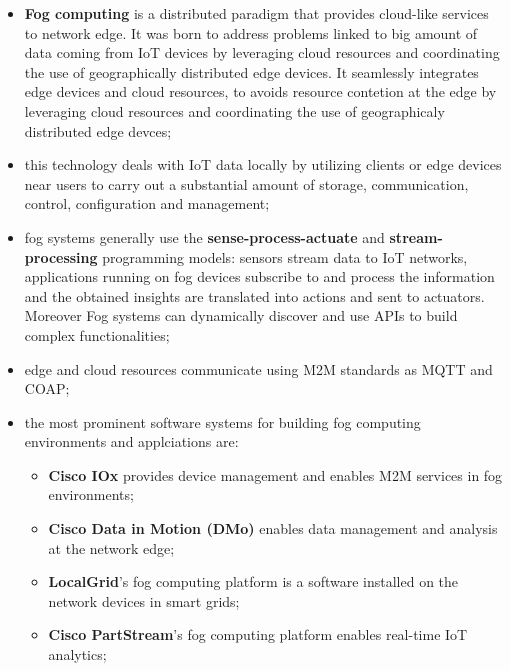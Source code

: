 \documentclass[oneside]{article}
\begin{document}
\begin{itemize}
    \item \textbf{Fog computing} is a distributed paradigm that provides cloud-like services to network edge. It was born to address problems linked to big amount of data coming from IoT devices by leveraging cloud resources and coordinating the use of geographically distributed edge devices. It seamlessly integrates edge devices and cloud resources, to avoids resource contetion at the edge by leveraging cloud resources and coordinating the use of geographicaly distributed edge devces;
    
    \item this technology deals with IoT data locally by utilizing clients or edge devices near users to carry out a substantial amount of storage, communication, control, configuration and management;
    
    \item fog systems generally use the \textbf{sense-process-actuate} and \textbf{stream-processing} programming models: sensors stream data to IoT networks, applications running on fog devices subscribe to and process the information and the obtained insights are translated into actions and sent to actuators. Moreover Fog systems can dynamically discover and use APIs to build complex functionalities;
    
    \item edge and cloud resources communicate using M2M standards as MQTT and COAP;
    
    \item the most prominent software systems for building fog computing environments and applciations are:
    \begin{itemize}
        \item \textbf{Cisco IOx} provides device management and enables M2M services in fog environments;
        \item \textbf{Cisco Data in Motion (DMo)} enables data management and analysis at the network edge;
        \item \textbf{LocalGrid}'s fog computing platform is a software installed on the network devices in smart grids;
        \item \textbf{Cisco PartStream}'s fog computing platform enables real-time IoT analytics;
    \end{itemize}
    

\end{itemize}
\end{document}
